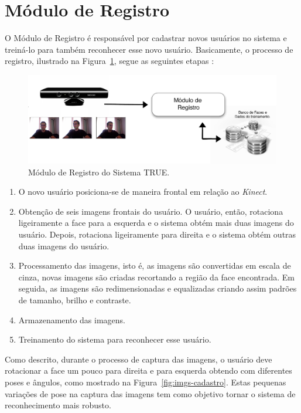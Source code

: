\section{Módulo de Registro}

	O Módulo de Registro é responsável por cadastrar novos usuários no sistema e treiná-lo para também reconhecer esse novo usuário. Basicamente, o processo de registro, ilustrado na Figura~\ref{fig:registro}, segue as seguintes etapas :

		\begin{figure}[htb]
			\begin{center}
				\includegraphics[scale=1.5]{figuras/4.ProblemaEProposta/registro.png}
			\end{center}
			\caption{Módulo de Registro do Sistema TRUE.}
			\label{fig:registro}
		\end{figure}		

		\begin{enumerate}
			\item O novo usuário posiciona-se de maneira frontal em relação ao \textit{Kinect}. 
			\item Obtenção de seis imagens frontais do usuário. O usuário, então, rotaciona ligeiramente a face para a esquerda e o sistema obtém mais duas imagens do usuário. Depois, rotaciona ligeiramente para direita e o sistema obtém outras duas imagens do usuário.
			\item Processamento das imagens, isto é, as imagens são convertidas em escala de cinza, novas imagens são criadas recortando a região da face encontrada. Em seguida, as imagens são redimensionadas e equalizadas criando assim padrões de tamanho, brilho e contraste.
			\item Armazenamento das imagens.
			\item Treinamento do sistema para reconhecer esse usuário.
		\end{enumerate}

	Como descrito, durante o processo de captura das imagens, o usuário deve rotacionar a face um pouco para direita e para esquerda obtendo com diferentes poses e ângulos, como mostrado na Figura~\ref{fig:imgs-cadastro}. Estas pequenas variações de pose na captura das imagens tem como objetivo tornar o sistema de reconhecimento mais robusto.

